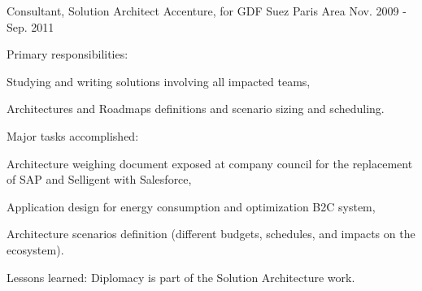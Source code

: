 \begin{cventries}
  \cventry
    {Consultant, Solution Architect} %
    {Accenture, for GDF Suez} %
    {Paris Area} %
    {Nov. 2009 - Sep. 2011} %
    {
      \begin{cvitems} %
        \item {Primary responsibilities:}
        \begin{cvsubitems}
          \item {Studying and writing solutions involving all impacted teams,}
          \item {Architectures and Roadmaps definitions and scenario sizing and scheduling.}
        \end{cvsubitems}
        \item {Major tasks accomplished:}
        \begin{cvsubitems}
          \item {Architecture weighing document exposed at company council for the replacement of SAP and Selligent with Salesforce,}
          \item {Application design for energy consumption and optimization B2C system,}
          \item {Architecture scenarios definition (different budgets, schedules, and impacts on the ecosystem).}
        \end{cvsubitems}
        \item {Lessons learned: Diplomacy is part of the Solution Architecture work.}
      \end{cvitems}
    }


\end{cventries}
